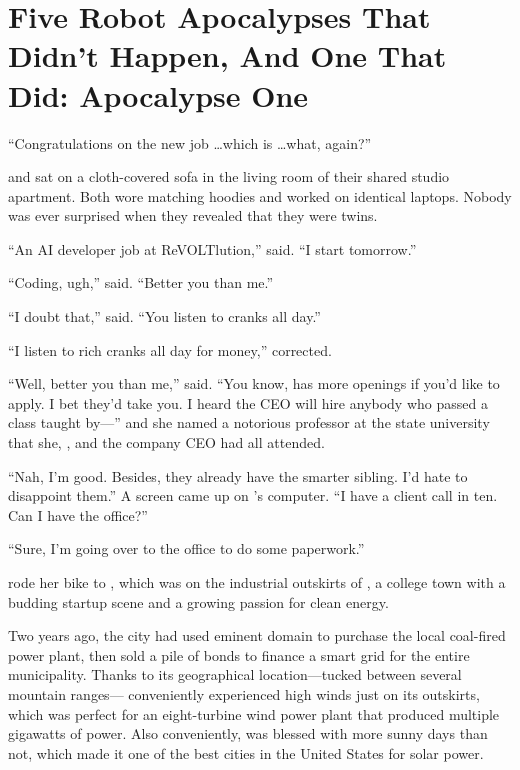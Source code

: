 \chapter{Five Robot Apocalypses That Didn't Happen, And One That Did: Apocalypse One}


``Congratulations on the new job \dots which is \dots what, again?''

{\protag} and {\sidetag} {\lastname} sat on a cloth-covered sofa in the living room of their shared studio apartment. Both wore matching hoodies and worked on identical laptops. Nobody was ever surprised when they revealed that they were twins.

``An AI developer job at ReVOLTlution,'' {\protag} said. ``I start tomorrow.''

``Coding, ugh,” {\sidetag} said. ``Better you than me.''

``I doubt that,'' {\protag} said. ``You listen to cranks all day.''

``I listen to rich cranks all day for money,'' {\sidetag} corrected.

``Well, better you than me,'' {\protag} said. ``You know, \energyCompany{} has more openings if you’d like to apply. I bet they’d take you. I heard the CEO will hire anybody who passed a class taught by---'' and she named a notorious professor at the state university that she, {\sidetag}, and the company CEO had all attended.

``Nah, I'm good. Besides, they already have the smarter sibling. I'd hate to disappoint them.'' A screen came up on {\sidetag}’s computer. ``I have a client call in ten. Can I have the office?''

``Sure, I’m going over to the office to do some paperwork.''

{\protag} rode her bike to \energyCompany{}, which was on the industrial outskirts of \crunchyCity{}, a college town with a budding startup scene and a growing passion for clean energy.

Two years ago, the city had used eminent domain to purchase the local coal-fired power plant, then sold a pile of bonds to finance a smart grid for the entire municipality. Thanks to its geographical location---tucked between several mountain ranges---\crunchyCity{} conveniently experienced high winds just on its outskirts, which was perfect for an eight-turbine wind power plant that produced multiple gigawatts of power. Also conveniently, \crunchyCity{} was blessed with more sunny days than not, which made it one of the best cities in the United States for solar power.

